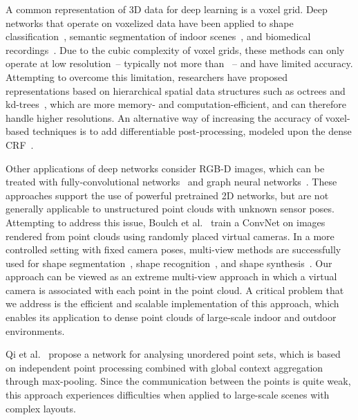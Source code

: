 \documentclass[10pt,twocolumn,letterpaper]{article}
\begin{document}
A common representation of 3D data for deep learning is a voxel grid. Deep networks that operate on voxelized data have been applied to shape classification~\cite{maturana15,wu15,qi16}, semantic segmentation of indoor scenes~\cite{dai17}, and biomedical recordings~\cite{cicek16,chen16}. Due to the cubic complexity of voxel grids, these methods can only operate at low resolution~-- typically not more than ~-- and have limited accuracy. Attempting to overcome this limitation, researchers have proposed representations based on hierarchical spatial data structures such as octrees and kd-trees~\cite{riegler17,wang17,Hane2017,Riegler2017:3DV,Gadelha2017:BMVC,KlokovLempitsky2017,Tatarchenko2017}, which are more memory- and computation-efficient, and can therefore handle higher resolutions. An alternative way of increasing the accuracy of voxel-based techniques is to add differentiable post-processing, modeled upon the dense CRF~\cite{KrahenbuhlKoltun2011,tchapmi17}.


Other applications of deep networks consider RGB-D images, which can be treated with fully-convolutional networks~\cite{Gupta2015,li16:ECCV,mccormac17} and graph neural networks~\cite{qi17iccv}. These approaches support the use of powerful pretrained 2D networks, but are not generally applicable to unstructured point clouds with unknown sensor poses. Attempting to address this issue, Boulch et al.~\cite{boulch17} train a ConvNet on images rendered from point clouds using randomly placed virtual cameras. In a more controlled setting with fixed camera poses, multi-view methods are successfully used for shape segmentation~\cite{kalogerakis17}, shape recognition~\cite{su15,qi16}, and shape synthesis~\cite{Gadelha2017:3DV,Lun2017,Kar2017,tatarchenko16}. Our approach can be viewed as an extreme multi-view approach in which a virtual camera is associated with each point in the point cloud. A critical problem that we address is the efficient and scalable implementation of this approach, which enables its application to dense point clouds of large-scale indoor and outdoor environments.

Qi et al.~\cite{qi17} propose a network for analysing unordered point sets, which is based on independent point processing combined with global context aggregation through max-pooling. Since the communication between the points is quite weak, this approach experiences difficulties when applied to large-scale scenes with complex layouts.
\end{document}
